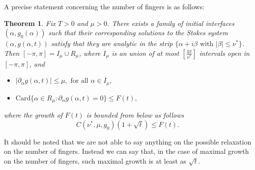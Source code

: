 \documentclass[11pt]{article}
\numberwithin{equation}{section}
\newtheorem{thm}{Theorem}[section]
\begin{document}
A precise statement concerning the number of fingers is as follows:
\begin{thm}\label{thm:2}
Fix $T>0$ and $\mu>0$. There exists a family of initial interfaces $(\alpha,g_0(\alpha))$ such that their corresponding solutions to the Stokes system $(\alpha,g(\alpha,t))$ satisfy that they are analytic in the strip $\{\alpha+i\beta\text{ with } |\beta|\leq \nu^*\}$. Then $[-\pi, \pi]=I_\mu\cup R_\mu$, where $I_\mu$ is an union of at most $[\frac{4\pi}{\nu^*}]$ intervals open in $[-\pi, \pi]$, and
\begin{itemize}
\item $|\partial_\alpha g(\alpha,t)| \leq \mu, \text{ for all }\alpha\in I_\mu,$
\item $\text{Card}\{\alpha \in R_\mu : \partial_\alpha g(\alpha,t)=0\}\leq
F(t),$
\end{itemize}
where the growth of $F(t)$ is bounded from below as follows
$$
C(\nu^*,\mu,g_0)(1+\sqrt{t})\leq F(t).
$$
\end{thm}

It should be noted that we are not able to say anything on the possible relaxation on the number of fingers. Instead we can say that, in the case of maximal growth on the number of fingers, such maximal growth is at least as $\sqrt{t}$.
\end{document}
